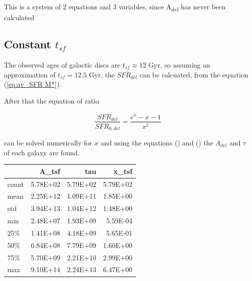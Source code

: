 \documentclass[a4paper,twocolumn]{article}
\begin{document}
This is a system of 2 equations and 3 variables, since A\textsubscript{del} has never been calculated

\subsection{Constant \(t_{sf}\)}
\label{sec:org0892bf5}
The observed ages of galactic discs are \(t_{sf}\approx 12\) Gyr\autocite{knoxSurveyCoolWhite1999}, so assuming an approximation of \(t_{sf}=12.5\) Gyr, the \(\overline{SFR_{del}}\) can be calcuated, from the equation (\ref{eq:av_SFR M*}).

After that the equation of ratio



\begin{equation} \label{eq:ratio}
    \frac{\overline{SFR_{del}}}{SFR_{0,del}}=\frac{e^x-x-1}{x^2}
\end{equation}

can be solved numerically for \(x\) and using the equations () and () the \(A_{del}\) and \(\tau\) of each galaxy are found.

\begin{table}[hc]
\centering
\begin{tabular}{lrrr}
\toprule
{} &    A\_tsf &      tau &    x\_tsf \\
\midrule
count & 5.78E+02 & 5.79E+02 & 5.79E+02 \\
mean  & 2.25E+12 & 1.09E+11 & 1.85E+00 \\
std   & 3.94E+13 & 1.04E+12 & 1.48E+00 \\
min   & 2.48E+07 & 1.93E+09 & 5.59E-04 \\
25\%   & 1.41E+08 & 4.18E+09 & 5.65E-01 \\
50\%   & 6.84E+08 & 7.79E+09 & 1.60E+00 \\
75\%   & 5.70E+09 & 2.21E+10 & 2.99E+00 \\
max   & 9.10E+14 & 2.24E+13 & 6.47E+00 \\
\bottomrule
\end{tabular}
\end{table}
\end{document}
